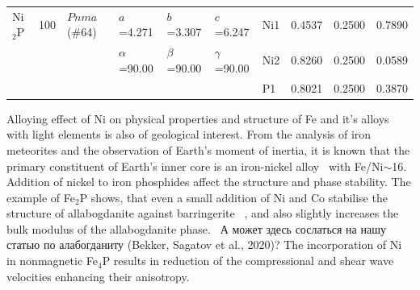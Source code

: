 \documentclass[twoside,twocolumn,9pt]{article}
\begin{document}
\begin{table}[t]
\begin{tabular*}{\textwidth}{@{\extracolsep{\fill}}llllllllll}
\midrule
    Ni$_{2}$P  & 100 & $Pnma$ (\#64) & $a$=4.271   & $b$=3.307   & $c$=6.247    & Ni1 & 0.4537   &  0.2500  &   0.7890  \\
&     &               & $\alpha$=90.00   & $\beta$=90.00   & $\gamma$=90.00   & Ni2 & 0.8260   &  0.2500  &   0.0589  \\   
&     &               &                  &                 &                  & P1 &  0.8021    & 0.2500   &  0.3870  \\
\hline
  \end{tabular*}
\end{table}



Alloying effect of Ni on physical properties and structure of Fe and it's alloys with light elements is also of geological interest. 
{\color{blue}From the analysis of iron meteorites and the observation of Earth's moment of inertia, it is known that the primary constituent of Earth's inner core is an iron-nickel alloy~\cite{Birch-1992} with Fe/Ni$\sim$16.~\cite{ALLEGRE-1995-515,MCDONOUGH-1995-223}}
Addition of nickel to iron phosphides affect the structure and phase stability. 
The example of Fe$_2$P shows, that even a small addition of Ni and Co stabilise the structure of allabogdanite against {\color{blue} barringerite} ~\cite{Britvin-2002, Buseck1969, Nisar-2010-EPSL}, and also slightly increases the  bulk modulus of the allabogdanite phase.~\cite{Nisar-2010-EPSL} 
{\color{red}А может здесь сослаться на нашу статью по алабогданиту (Bekker, Sagatov et al., 2020)?}
The incorporation of Ni in nonmagnetic Fe$_4$P results in reduction of the compressional and shear wave velocities enhancing their anisotropy.\cite{Wu-2011-GRL}
\end{document}

